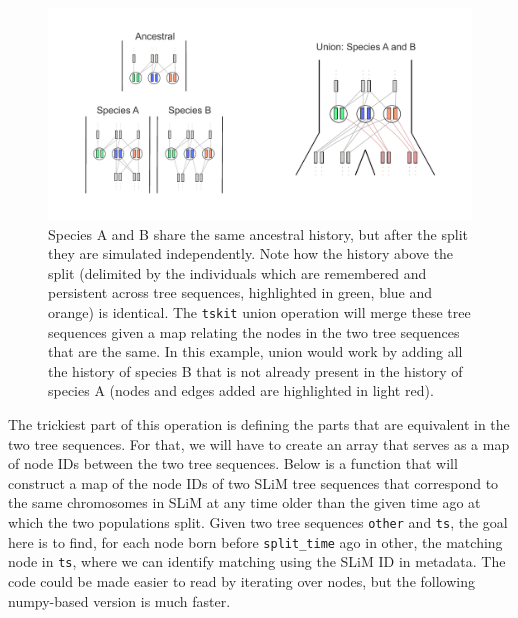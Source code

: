 \documentclass[12pt]{article}
\newcommand{\tskit}[0]{\texttt{tskit}\xspace}
\begin{document}
\begin{figure}[h!]
    \centering
     \includegraphics[width=\textwidth]{./figures/union.pdf}
     \caption{Species A and B share the same ancestral history, but after the split they are simulated independently. Note how the history above the split (delimited by the individuals which are remembered and persistent across tree sequences, highlighted in green, blue and orange) is identical. The \tskit union operation will merge these tree sequences given a map relating the nodes in the two tree sequences that are the same. In this example, union would work by adding all the history of species B that is not already present in the history of species A (nodes and edges added are highlighted in light red).}
     \label{fig:union}
    \end{figure}

The trickiest part of this operation is defining the parts that are equivalent in the two tree sequences.
For that, we will have to create an array that serves as a map of node IDs between the two tree sequences.
Below is a function that will construct a map of the node IDs of two SLiM tree sequences that correspond to the same chromosomes in SLiM at any time older than the given time ago at which the two populations split. 
Given two tree sequences \verb|other| and \verb|ts|, the goal here is to find, for each node born before \verb|split_time| ago in other, the matching node in \verb|ts|, where we can identify matching using the SLiM ID in metadata.
The code could be made easier to read by iterating over nodes, 
but the following numpy-based version is much faster.
\end{document}
